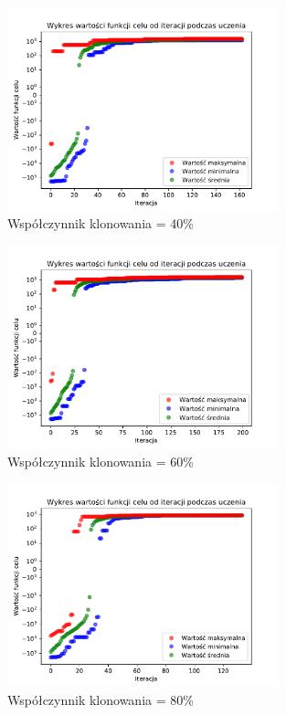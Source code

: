 \documentclass[a4paper]{article}
\begin{document}
\begin{figure}[H]
    \centering
    \includegraphics[width=0.7\textwidth]{plots/clone_040.pdf}
    \caption{Współczynnik klonowania = 40\%}
    \label{fig:clone_040}
\end{figure}

\begin{figure}[H]
    \centering
    \includegraphics[width=0.7\textwidth]{plots/clone_060.pdf}
    \caption{Współczynnik klonowania = 60\%}
    \label{fig:clone_060}
\end{figure}

\begin{figure}[H]
    \centering
    \includegraphics[width=0.7\textwidth]{plots/clone_080.pdf}
    \caption{Współczynnik klonowania = 80\%}
    \label{fig:clone_080}
\end{figure}
\end{document}
